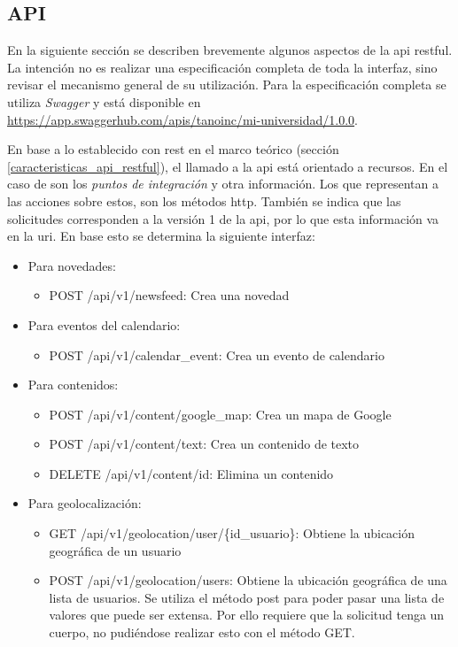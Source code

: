 \subsection{API}
\label{funcionalidad_noticias_api}

En la siguiente sección se describen brevemente algunos aspectos de la \gls{api} \gls{restful}. La intención no es realizar una especificación completa de toda la interfaz, sino revisar el mecanismo general de su utilización. Para la especificación completa se utiliza \textit{Swagger} y está disponible en \url{https://app.swaggerhub.com/apis/tanoinc/mi-universidad/1.0.0}.

En base a lo establecido con \gls{rest} en el marco teórico (sección \ref{caracteristicas_api_restful}), el llamado a la \gls{api} está orientado a recursos. En el caso de \nombreApp{} son los \textit{puntos de integración} y otra información. Los  que representan a las acciones sobre estos, son los métodos \gls{http}. También se indica que las solicitudes corresponden a la versión 1 de la \gls{api}, por lo que esta información va en la \gls{uri}. En base esto se determina la siguiente interfaz:

\begin{itemize}
\item Para novedades:
\begin{itemize}
\item POST /api/v1/newsfeed: Crea una novedad
\end{itemize}
\item Para eventos del calendario:
\begin{itemize}
\item POST /api/v1/calendar\_event: Crea un evento de calendario
\end{itemize}
\item Para contenidos:
\begin{itemize}
\item POST /api/v1/content/google\_map: Crea un mapa de Google
\item POST /api/v1/content/text: Crea un contenido de texto
\item DELETE /api/v1/content/{id}: Elimina un contenido
\end{itemize}
\item Para geolocalización:
\begin{itemize}
\item GET /api/v1/geolocation/user/\{id\_usuario\}: Obtiene la ubicación geográfica de un usuario
\item POST /api/v1/geolocation/users: Obtiene la ubicación geográfica de una lista de usuarios. Se utiliza el método post para poder pasar una lista de valores que puede ser extensa. Por ello requiere que la solicitud tenga un cuerpo, no pudiéndose realizar esto con el método GET.
\end{itemize}
\end{itemize}

